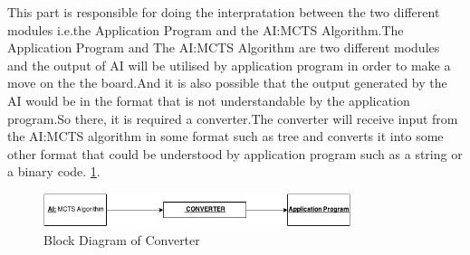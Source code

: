 This part is responsible for doing the interpratation between the two different modules i.e.the Application Program and the AI:MCTS Algorithm.The Application Program and The AI:MCTS Algorithm are two different modules and the output of  AI will be utilised by application program in order to make a move on the the board.And it is also possible that the output generated by the AI would be in the format that is not understandable by the application program.So there, it is required a converter.The converter will receive input from the AI:MCTS algorithm in some format such as tree and converts it into some other format that could be understood by application program such as a string or a binary code. \ref{fig:flowchart}.
\newpage


\begin{figure}[H]
	\centering
	\includegraphics[width=0.80\textwidth]{2General_Architecture/2.2API/img/CONVERTER.png}
	\caption{Block Diagram of Converter}
	\label{fig:flowchart}
\end{figure}
\thispagestyle{empty}

